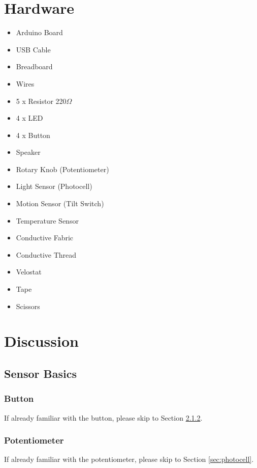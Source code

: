 \documentclass[12pt,letterpaper,oneside]{article}
\begin{document}
\section{Hardware}
		\begin{itemize} \parskip0pt
			\item Arduino Board
			\item USB Cable
			\item Breadboard
			\item Wires
			\item 5 x Resistor 220$\Omega$
			\item 4 x LED
			\item 4 x Button
			\item Speaker
			\item Rotary Knob (Potentiometer)
			\item Light Sensor (Photocell)
			\item Motion Sensor (Tilt Switch)
			\item Temperature Sensor
			\item Conductive Fabric
			\item Conductive Thread
			\item Velostat
			\item Tape
			\item Scissors
		\end{itemize}

\section{Discussion}
	\subsection{Sensor Basics}	
			\subsubsection{Button}
			If already familiar with the button, please skip to Section \ref{sec:potentiometer}. 

			\subsubsection{Potentiometer} \label{sec:potentiometer}
			If already familiar with the potentiometer, please skip to Section \ref{sec:photocell}. 
			
\end{document}
